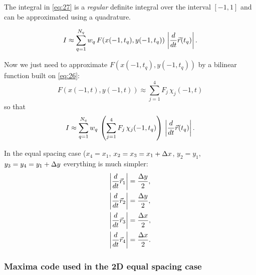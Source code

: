 \documentclass[11pt]{article}
\begin{document}
The integral in \eqref{eq:27} is a \emph{regular} definite integral over
the interval $[-1, 1]$ and can be approximated using a quadrature.

\begin{equation}
\label{eq:29}
I \approx \sum_{q=1}^{N_{q}} w_{q}\, F(x(-1, t_{q}), y(-1, t_{q}))\, \left|\frac{d}{dt}\vec r(t_{q}) \right|.
\end{equation}

Now we just need to approximate $F(x(-1, t_{q}), y(-1, t_{q}))$ by
a bilinear function built on \eqref{eq:26}:
\begin{equation}
\label{eq:30}
F(x(-1, t), y(-1, t)) \approx \sum_{j=1}^{4} F_{j}\, \chi_{j}(-1, t)
\end{equation}
so that
\begin{equation}
\label{eq:31}
I \approx \sum_{q=1}^{N_{q}} w_{q}\,
\left( \sum_{j=1}^{4} F_{j}\, \chi_{j}(-1, t_{q}) \right) \,
\left| \frac{d}{dt}\vec r(t_{q}) \right|.
\end{equation}

In the equal spacing case ($x_{4} = x_{1}$, $x_{2} = x_{3} = x_{1} +
\Delta x$, $y_{2} = y_{1}$, $y_{3} = y_{4} = y_{1} + \Delta y$ everything is much simpler:
\begin{align*}
\left| \frac{d}{dt}\vec r_{1}\right|  & = \frac{\Delta y}{2}, \\
\left| \frac{d}{dt}\vec r_{2}\right|  & = \frac{\Delta y}{2}, \\
\left| \frac{d}{dt}\vec r_{3}\right|  & = \frac{\Delta x}{2}, \\
\left| \frac{d}{dt}\vec r_{4}\right|  & = \frac{\Delta x}{2}. \\
\end{align*}

\subsubsection{Maxima code used in the 2D equal spacing case}
\label{sec-3-1-1}
\end{document}

